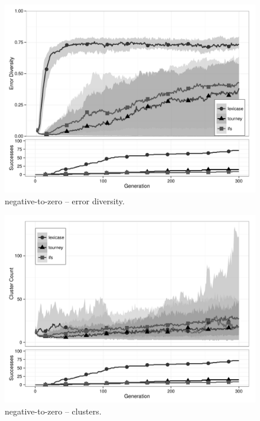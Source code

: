 \begin{figure}%
\centering
\includegraphics[width=11.5cm]{negative-to-zero-diversity.pdf}
\caption{negative-to-zero -- error diversity.}
\label{negative-to-zeroDiv}
\end{figure}

\begin{figure}%
\centering
\includegraphics[width=11.5cm]{negative-to-zero-cluster.pdf}
\caption{negative-to-zero -- clusters.}
\label{negative-to-zeroClu}
\end{figure}

